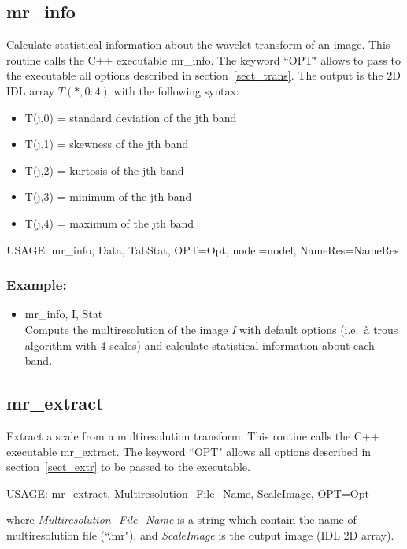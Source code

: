 \subsection{mr\_info}
Calculate statistical information about the wavelet transform
of an image. This routine calls 
the C++ executable {mr\_info}. 
The keyword ``OPT" allows to pass to the executable all
options described in section~\ref{sect_trans}.
The output is the 2D IDL array $T(*,0:4)$ with the following
syntax:
\begin{itemize}
\item  T(j,0) = standard deviation of the jth band
\item T(j,1) = skewness of the jth band
\item T(j,2) = kurtosis of the jth band
\item T(j,3) = minimum of the jth band
\item T(j,4) = maximum of the jth band
\end{itemize}

{\bf
\begin{center}
  USAGE: mr\_info, Data, TabStat, OPT=Opt, nodel=nodel, NameRes=NameRes
\end{center}}
\subsubsection*{Example:}
\begin{itemize}
\item mr\_info, I, Stat \\
Compute the multiresolution of the image {\em I} with default options
(i.e.\ \`a trous algorithm with 4 scales) and calculate statistical
information about each band.
\end{itemize}


\subsection{mr\_extract}
Extract a scale from a multiresolution transform. This routine 
calls the C++ executable {mr\_extract}. The keyword ``OPT" 
allows 
all options described in 
section~\ref{sect_extr}
to be passed to the executable.
{\bf
\begin{center}
   USAGE: mr\_extract, Multiresolution\_File\_Name, ScaleImage, OPT=Opt
\end{center}}
where {\em Multiresolution\_File\_Name} is a string which contain the 
name of multiresolution file (``.mr"), and {\em ScaleImage} is the output
image (IDL 2D array).

